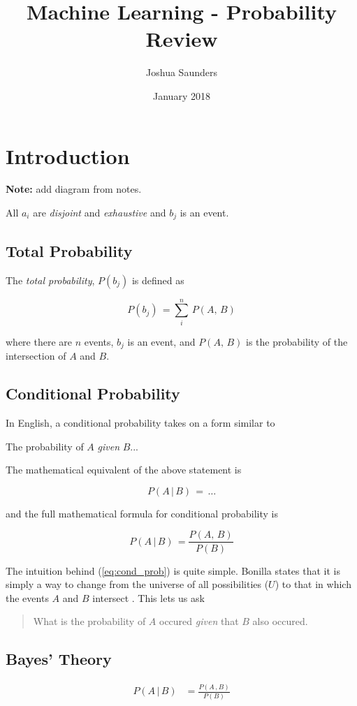 \documentclass{article}
\title{Machine Learning - Probability Review}
\author{Joshua Saunders}
\date{January 2018}
\begin{document}
\maketitle

\section{Introduction}

\textbf{Note:} add diagram from notes.

All $a_i$ are \textit{disjoint} and \textit{exhaustive} and $b_j$ is an event.

\subsection{Total Probability}

The \textit{total probability}, $P(b_j)$ is defined as

\begin{equation} \label{eq:total_prob}
    P(b_j) \, = \sum_{i}^{n} \, P(A, \, B)  
\end{equation}


\noindent
where there are $n$ events, $b_j$ is an event, and $P(A, \, B)$ is the 
probability of the intersection of $A$ and $B$.


\subsection{Conditional Probability}

In English, a conditional probability takes on a form similar to 

\begin{displayquote}
The probability of $A$ \textit{given} $B$...
\end{displayquote}

\noindent
The mathematical equivalent of the above statement is

\begin{equation}
    P(A \, | \, B) \, = \, \ldots \nonumber
\end{equation}

\noindent
and the full mathematical formula for conditional probability is

\begin{equation} \label{eq:cond_prob}
    P(A \, | \, B) \, = \frac{P(A, \, B)}{P(B)}
\end{equation}

\noindent
The intuition behind (\ref{eq:cond_prob}) is quite simple. Bonilla states
that it is simply a way to change from the universe of all possibilities ($U$)
to that in which the events $A$ and $B$ intersect \cite{oscarbonilla}. This
lets us ask

\begin{quote}
    What is the probability of $A$ occured \textit{given} that $B$ also occured.
\end{quote}

\subsection{Bayes' Theory}


\begin{align}
    P(A \, | \, B) &= \frac{P(A \, , B)}{P(B)}
\end{align}




\end{document}

